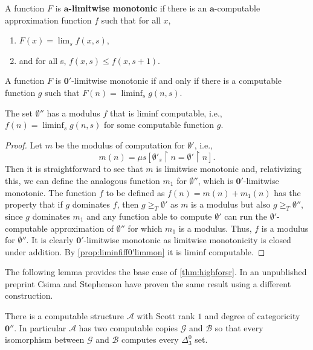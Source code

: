 \documentclass[10pt,a4paper]{amsart}
\newcommand\+[1]{\mathcal{#1}}
\renewcommand\*[1]{\mathbf{#1}}
\renewcommand\=[1]{\text{#1}}
\renewcommand\*[1]{\mathbf{#1}}
\newcommand{\A}{\mathcal{A}}
\newcommand{\B}{\mathcal{B}}
\DeclareMathOperator{\restrict}{\upharpoonright}
\newcommand{\define}[1]{\textbf{#1}}
\begin{document}
\begin{definition}\label{def:alimmon}
  A function $F$ is \define{$\mathbf{a}$-limitwise monotonic} if there is an $\mathbf a$-computable approximation function $f$ such that  for all $x$,
  \begin{enumerate}
    \item $F(x)=\lim_s f(x,s)$,
    \item and for all s, $f(x,s)\leq f(x,s+1)$.
  \end{enumerate}
\end{definition}
\begin{lemma}\label{prop:liminfiff0'limmon}
   A function $F$ is $\mathbf 0'$-limitwise monotonic if and only if there is a computable function $g$ such that $F(n)=\liminf_s g(n,s)$. 
\end{lemma}
\begin{lemma}\label{lem:0''liminfmod}
  The set $\emptyset''$ has a modulus $f$ that is liminf computable, i.e., $f(n)=\liminf_s g(n,s)$ for some computable function $g$.
 \end{lemma}
 \begin{proof} Let $m$ be the modulus of computation for $\emptyset'$, i.e., 
  \[ m(n)=\mu s [\emptyset'_s\restrict n=\emptyset'\restrict n].\]
  Then it is straightforward to see that $m$ is limitwise monotonic and, relativizing this, we can define the analogous function $m_1$ for $\emptyset''$, which is $\mathbf 0'$-limitwise monotonic. The function $f$ to be defined as $f(n)=m(n)+m_1(n)$ has the property that if $g$ dominates $f$, then $g\geq_T \emptyset '$ as $m$ is a modulus but also $g\geq_T \emptyset''$, since $g$ dominates $m_1$ and any function able to compute $\emptyset'$ can run the $\emptyset'$-computable approximation of $\emptyset''$ for which $m_1$ is a modulus. Thus, $f$ is a modulus for $\emptyset''$. It is clearly $\mathbf 0'$-limitwise monotonic as limitwise monotonicity is closed under addition. By \cref{prop:liminfiff0'limmon} it is liminf computable.
 \end{proof}
 The following lemma provides the base case of \cref{thm:highforsr}. In an unpublished preprint Csima and Stephenson have proven the same result using a different construction.  
 \begin{lemma}\label{lem:sr1dgcat''}
   There is a computable structure $\A$ with Scott rank $1$ and degree of categoricity $\mathbf 0''$. In particular $\A$ has two computable copies $\mathcal{G}$ and $\B$ so that every isomorphism between $\+G$ and $\B$ computes every $\Delta^0_3$ set.
 \end{lemma}
\end{document}
